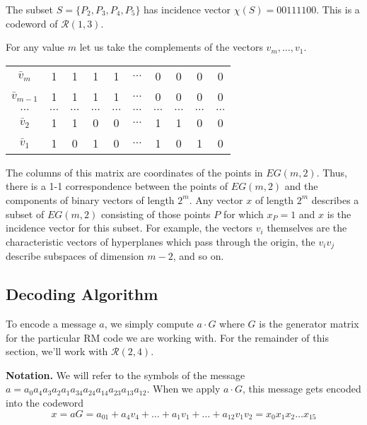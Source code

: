 \documentclass[12pt]{article}
\begin{document}
The subset $S = \{P_2, P_3, P_4, P_5\}$ has incidence vector $\chi(S) = 00111100$. This is a codeword of $\mathscr{R}(1,3)$.

\bigskip

For any value $m$ let us take the complements of the vectors $v_m, \ldots , v_1$. 
\begin{center}
\begin{tabular}{ c c c c c c c c c c }
$\bar{v}_m$ & 1 & 1 & 1 & 1 &$\ldots$ & 0 & 0 & 0 & 0\\
$\bar{v}_{m-1}$ &1 & 1 & 1 & 1 &$\ldots$ & 0 & 0 & 0 & 0\\
$\ldots$ &$\ldots$ &$\ldots$ &$\ldots$ &$\ldots$ &$\ldots$ &$\ldots$ &$\ldots$ &$\ldots$ &$\ldots$ \\
$\bar{v}_2$ & 1 & 1 & 0 & 0 & $\ldots$ & 1 & 1 & 0 & 0\\   
$\bar{v}_1$ & 1 & 0 & 1 & 0 &$\ldots$ & 1 & 0 & 1 & 0\\   
\end{tabular}
\end{center}

The columns of this matrix are coordinates of the points in $EG(m,2)$. Thus, there is a 1-1 correspondence between the points of $EG(m,2)$ and the components of binary vectors of length $2^m$. Any vector $x$ of length $2^m$ describes a subset of $EG(m,2)$ consisting of those points $P$ for which $x_P = 1$ and $x$ is the incidence vector for this subset. For example, the vectors $v_i$ themselves are the characteristic vectors of hyperplanes which pass through the origin, the $v_iv_j$ describe subspaces of dimension $m-2$, and so on.

\subsection{Decoding Algorithm}
To encode a message $a$, we simply compute $a\cdot G$ where $G$ is the generator matrix for the particular RM code we are working with. For the remainder of this section, we'll work with $\mathscr{R}(2,4)$.

\bigskip

\textbf{Notation.} We will refer to the symbols of the message $a = a_0a_4a_3a_2a_1a_{34}a_{24}a_{14}a_{23}a_{13}a_{12}$. When we apply $a \cdot G$, this message gets encoded into the codeword
$$
x = aG = a_01 + a_4v_4 + \ldots + a_1v_1 + \ldots + a_{12}v_1v_2 = x_0x_1x_2\ldots x_{15}
$$
\end{document}
